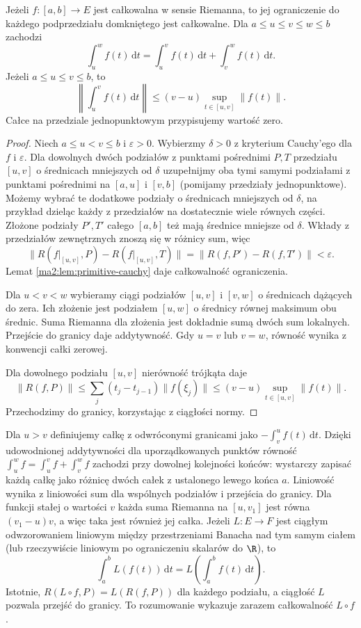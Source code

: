 \begin{twierdzenie}
\label{ma2:thm:primitive-subinterval}
Jeżeli $f:[a,b]\to E$ jest całkowalna w sensie
Riemanna, to jej ograniczenie do każdego
podprzedziału domkniętego jest całkowalne.
Dla $a\le u\le v\le w\le b$ zachodzi
\[
 \int_u^w f(t)\,\mathrm dt
 =\int_u^v f(t)\,\mathrm dt+\int_v^w f(t)\,\mathrm dt.
\]
Jeżeli $a\le u\le v\le b$, to
\[
 \left\|\int_u^v f(t)\,\mathrm dt\right\|
 \le(v-u)\sup_{t\in[u,v]}\|f(t)\|.
\]
Całce na przedziale jednopunktowym przypisujemy
wartość zero.
\end{twierdzenie}
\begin{proof}
Niech $a\le u<v\le b$ i $\varepsilon>0$.
Wybierzmy $\delta>0$ z kryterium Cauchy'ego
dla $f$ i $\varepsilon$. Dla dowolnych
dwóch podziałów z punktami pośrednimi $P,T$
przedziału $[u,v]$ o średnicach mniejszych
od $\delta$ uzupełnijmy oba tymi samymi
podziałami z punktami pośrednimi na $[a,u]$
i $[v,b]$ (pomijamy przedziały jednopunktowe).
Możemy wybrać te dodatkowe podziały o
średnicach mniejszych od $\delta$, na przykład
dzieląc każdy z przedziałów na dostatecznie
wiele równych części. Złożone podziały
$P',T'$ całego $[a,b]$ też mają średnice
mniejsze od $\delta$. Wkłady z przedziałów
zewnętrznych znoszą się w różnicy sum, więc
\[
 \|R(f|_{[u,v]},P)-R(f|_{[u,v]},T)\|
 =\|R(f,P')-R(f,T')\|<\varepsilon.
\]
Lemat \ref{ma2:lem:primitive-cauchy} daje
całkowalność ograniczenia.

Dla $u<v<w$ wybieramy ciągi podziałów
$[u,v]$ i $[v,w]$ o średnicach dążących do zera.
Ich złożenie jest podziałem $[u,w]$
o średnicy równej maksimum obu średnic.
Suma Riemanna dla złożenia jest dokładnie
sumą dwóch sum lokalnych. Przejście do granicy
daje addytywność. Gdy $u=v$ lub $v=w$,
równość wynika z konwencji całki zerowej.

Dla dowolnego podziału $[u,v]$ nierówność
trójkąta daje
\[
 \|R(f,P)\|\le
 \sum_j(t_j-t_{j-1})\|f(\xi_j)\|
 \le(v-u)\sup_{t\in[u,v]}\|f(t)\|.
\]
Przechodzimy do granicy, korzystając
z ciągłości normy.
\end{proof}

Dla $u>v$ definiujemy całkę z odwróconymi granicami
jako $-\int_v^u f(t)\,\mathrm dt$.
Dzięki udowodnionej addytywności dla uporządkowanych
punktów równość
$\int_u^w f=\int_u^v f+\int_v^w f$
zachodzi przy dowolnej kolejności końców:
wystarczy zapisać każdą całkę jako różnicę
dwóch całek z ustalonego lewego końca $a$.
Liniowość wynika z liniowości sum dla wspólnych
podziałów i przejścia do granicy.
Dla funkcji stałej o wartości $v$ każda suma
Riemanna na $[u,v_1]$ jest równa $(v_1-u)v$,
a więc taka jest również jej całka.
Jeżeli $L:E\to F$ jest ciągłym odwzorowaniem
liniowym między przestrzeniami Banacha
nad tym samym ciałem (lub rzeczywiście
liniowym po ograniczeniu skalarów do $\R$),
to
\[
 \int_a^b L(f(t))\,\mathrm dt
 =L\left(\int_a^b f(t)\,\mathrm dt\right).
\]
Istotnie, $R(L\circ f,P)=L(R(f,P))$ dla każdego
podziału, a ciągłość $L$ pozwala przejść do granicy.
To rozumowanie wykazuje zarazem całkowalność
$L\circ f$.

